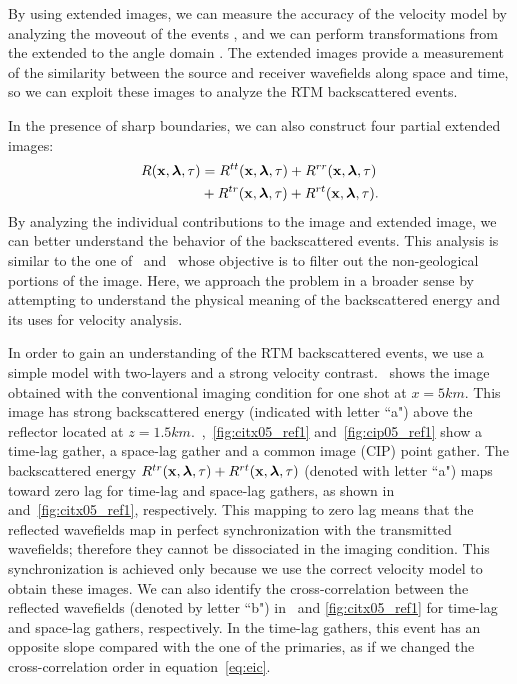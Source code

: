 By using extended images, we can measure the accuracy of the velocity model by analyzing the moveout of the events
 \citep{yang:S151}, and we can perform transformations from the extended to the angle domain 
\citep{sava:1065,sava:S209,sava:S131}. The extended images provide a measurement of the similarity between the source
 and receiver wavefields along space and time, so we can exploit these images to analyze the RTM backscattered events.

In the presence of sharp boundaries, we can also construct four partial extended images:
%
\begin{align}
\nonumber R({\bf x},{\boldsymbol{\lambda}},\tau) &= R^{tt}({\bf x},{\boldsymbol{\lambda}},\tau)+R^{rr}({\bf x},{\boldsymbol{\lambda}},\tau) \\
     &+R^{tr}({\bf x},{\boldsymbol{\lambda}},\tau)+R^{rt}({\bf x},{\boldsymbol{\lambda}},\tau).
\label{eq:eicsplit}
\end{align}
%
By analyzing the individual contributions to the image and extended image, we can better understand the behavior of the backscattered events.
 This analysis is similar to the one of~\cite{fei:3130} and~\cite{liu:S29}
whose objective is to filter out the non-geological portions of the image. Here, we approach the problem 
in a broader sense by attempting to understand the physical meaning of the backscattered energy and its
uses for velocity analysis.


In order to gain an understanding of the RTM backscattered events, we use a simple model with two-layers and a strong velocity
contrast.~ shows the image obtained with the conventional imaging condition for one shot at $x=5km$. This image has strong 
backscattered energy (indicated with letter ``a") above the reflector located at $z=1.5km$.~,~\ref{fig:citx05_ref1} and~\ref{fig:cip05_ref1}
show a time-lag gather, a space-lag gather and a common image (CIP) point gather. The backscattered energy $R^{tr}({\bf x},{\boldsymbol{\lambda}},\tau)+R^{rt}({\bf x},{\boldsymbol{\lambda}},\tau)$ (denoted with letter ``a")
maps toward zero lag for time-lag and space-lag gathers, as shown in~ and~\ref{fig:citx05_ref1}, respectively. 
%
This mapping to zero lag means that the reflected wavefields map in perfect synchronization with the transmitted wavefields;
therefore they cannot be dissociated in the imaging condition. This synchronization is achieved only because we use the correct velocity model to 
obtain these images.
%
We can also identify the cross-correlation between the reflected wavefields (denoted by letter ``b") in~ and
\ref{fig:citx05_ref1} for time-lag and space-lag gathers, respectively. 
In the time-lag gathers, this event has an opposite slope compared with the one of the primaries, 
as if we changed the cross-correlation order in equation~\ref{eq:eic}. 


